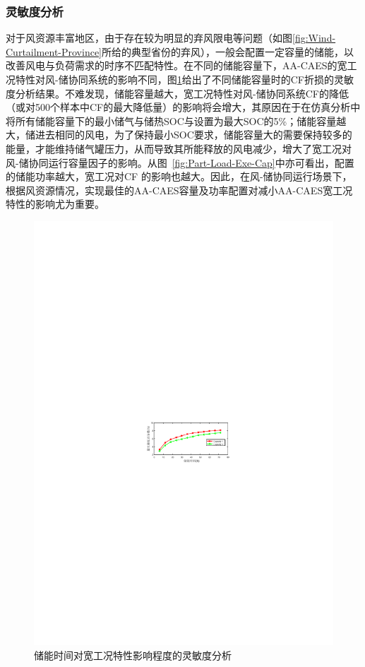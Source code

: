 \subsubsection{灵敏度分析}
对于风资源丰富地区，由于存在较为明显的弃风限电等问题（如图\ref{fig:Wind-Curtailment-Province}所给的典型省份的弃风），一般会配置一定容量的储能，以改善风电与负荷需求的时序不匹配特性。在不同的储能容量下，AA-CAES的宽工况特性对风-储协同系统的影响不同，图\ref{fig:Part-Load-Exe-Str-Sen}给出了不同储能容量时的CF折损的灵敏度分析结果。不难发现，储能容量越大，宽工况特性对风-储协同系统CF的降低（或对500个样本中CF的最大降低量）的影响将会增大，其原因在于在仿真分析中将所有储能容量下的最小储气与储热SOC与设置为最大SOC的5\%；储能容量越大，储进去相同的风电，为了保持最小SOC要求，储能容量大的需要保持较多的能量，才能维持储气罐压力，从而导致其所能释放的风电减少，增大了宽工况对风-储协同运行容量因子的影响\cite{CAES-Wind-Rui-19}。从图~\ref{fig:Part-Load-Exe-Cap}中亦可看出，配置的储能功率越大，宽工况对CF 的影响也越大。因此，在风-储协同运行场景下，根据风资源情况，实现最佳的AA-CAES容量及功率配置对减小AA-CAES宽工况特性的影响尤为重要。

\begin{figure}[H] %
  \centering
  \includegraphics[scale=1.75]{figures/Chap3-15-Part-Load-Exe-Str-Sen.pdf}
  \caption{储能时间对宽工况特性影响程度的灵敏度分析}
  \label{fig:Part-Load-Exe-Str-Sen}
\end{figure}

